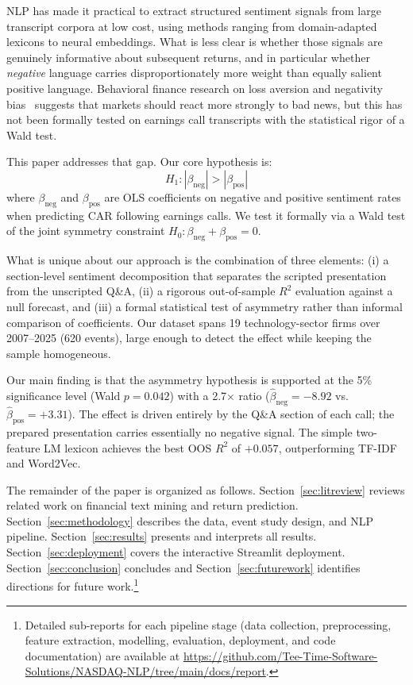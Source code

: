\documentclass[conference]{IEEEtran}
\begin{document}
NLP has made it practical to extract structured sentiment signals from large
transcript corpora at low cost, using methods ranging from domain-adapted
lexicons to neural embeddings. What is less clear is whether those signals are
genuinely informative about subsequent returns, and in particular whether
\emph{negative} language carries disproportionately more weight than equally
salient positive language. Behavioral finance research on loss aversion and
negativity bias~\cite{ref_suzuki2020} suggests that markets should react more
strongly to bad news, but this has not been formally tested on earnings call
transcripts with the statistical rigor of a Wald test.

This paper addresses that gap. Our core hypothesis is:
\begin{equation}
H_1: |\beta_{\text{neg}}| > |\beta_{\text{pos}}|
\end{equation}
where $\beta_{\text{neg}}$ and $\beta_{\text{pos}}$ are OLS coefficients on
negative and positive sentiment rates when predicting CAR following earnings calls.
We test it formally via a Wald test of the joint symmetry constraint
$H_0: \beta_{\text{neg}} + \beta_{\text{pos}} = 0$.

What is unique about our approach is the combination of three elements: (i) a
section-level sentiment decomposition that separates the scripted presentation
from the unscripted Q\&A, (ii) a rigorous out-of-sample $R^2$ evaluation against
a null forecast, and (iii) a formal statistical test of asymmetry rather than
informal comparison of coefficients. Our dataset spans 19 technology-sector
firms over 2007--2025 (620 events), large enough to detect the effect while
keeping the sample homogeneous.

Our main finding is that the asymmetry hypothesis is supported at the 5\%
significance level (Wald $p = 0.042$) with a 2.7$\times$ ratio
($\hat\beta_{\text{neg}} = -8.92$ vs.\ $\hat\beta_{\text{pos}} = +3.31$).
The effect is driven entirely by the Q\&A section of each call; the prepared
presentation carries essentially no negative signal. The simple two-feature
LM lexicon achieves the best OOS $R^2$ of $+0.057$, outperforming TF-IDF
and Word2Vec.

The remainder of the paper is organized as follows. Section~\ref{sec:litreview}
reviews related work on financial text mining and return prediction.
Section~\ref{sec:methodology} describes the data, event study design, and NLP
pipeline. Section~\ref{sec:results} presents and interprets all results.
Section~\ref{sec:deployment} covers the interactive Streamlit deployment.
Section~\ref{sec:conclusion} concludes and Section~\ref{sec:futurework}
identifies directions for future work.\footnote{Detailed sub-reports for each
pipeline stage (data collection, preprocessing, feature extraction, modelling,
evaluation, deployment, and code documentation) are available at
\url{https://github.com/Tee-Time-Software-Solutions/NASDAQ-NLP/tree/main/docs/report}.}
\end{document}

